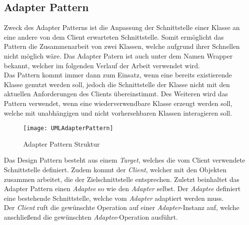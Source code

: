\subsection{Adapter Pattern}\label{sec:AdapterPattern}
Zweck des Adapter Patterns ist die Anpassung der Schnittstelle einer Klasse an eine andere von dem Client erwarteten Schnittstelle. Somit ermöglicht das Pattern die Zusammenarbeit von zwei Klassen, welche aufgrund ihrer Schnellen nicht möglich wäre. Das Adapter Patern ist auch unter dem Namen Wrapper bekannt, welcher im folgenden Verlauf der Arbeit verwendet wird.\\
Das Pattern kommt immer dann zum Einsatz, wenn eine bereits existierende Klasse genutzt werden soll, jedoch die Schnittstelle der Klasse nicht mit den aktuellen Anforderungen des Clients übereinstimmt. Des Weiteren wird das Pattern verwendet, wenn eine wiederverwendbare Klasse erzeugt werden soll, welche mit unabhängigen und nicht vorhersehbaren Klassen interagieren soll.\\      
\begin{center}
    \begin{figure}[h]
     \centering
     \texttt{[image: UMLAdapterPattern]}
     \caption{Adapter Pattern Struktur \cite{DesignPatterns}}
    \label{fig:AdapterPattern}
    \end{figure}
\end{center}
\vspace{-2cm}
Das Design Pattern besteht aus einem \textit{Target}, welches die vom Client verwendete Schnittstelle definiert. Zudem kommt der \textit{Client}, welcher mit den Objekten zusammen arbeitet, die der Zielschnittstelle entsprechen. Zuletzt beinhaltet das Adapter Pattern einen \textit{Adaptee} so wie den \textit{Adapter} selbst. Der \textit{Adaptee} definiert eine bestehende Schnittstelle, welche vom \textit{Adapter} adaptiert werden muss.\\ 
Der \textit{Client} ruft die gewünschte Operation auf einer \textit{Adapter}-Instanz auf, welche anschließend die gewünschten \textit{Adaptee}-Operation ausführt.


